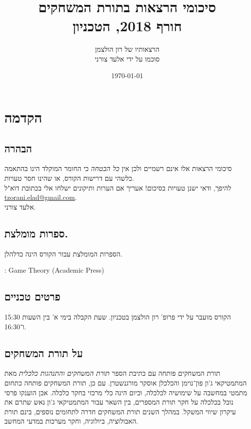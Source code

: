 \documentclass[a4paper,10pt,twoside,openany]{book}
\title{סיכומי הרצאות בתורת המשחקים \\ \large{חורף 2018, הטכניון}}
\author{הרצאותיו של רון הולצמן \\ \large סוכמו על ידי אלעד צורני}
\date{\today}
\begin{document}
\frontmatter
{}
\tableofcontents
\countlectures
\newpage

\chapter*{הקדמה}
 

\section*{הבהרה}

סיכומי הרצאות אלו אינם רשמיים ולכן אין
\emph{כל הבטחה}
כי החומר המוקלד הינו בהתאמה כלשהי עם דרישות הקורס, או שהינו חסר טעויות.
\\
להיפך, ודאי ישנן טעויות בסיכום! אעריך אם הערות ותיקונים ישלחו אלי בכתובת דוא"ל
\textenglish{\href{mailto:tzorani.elad@gmail.com}{tzorani.elad@gmail.com}}.\\
אלעד צורני.

\section*{ספרות מומלצת.}

הספרות המומלצת עבור הקורס הינה כדלהלן.

\begin{english}
\begin{description}
\item {}: Game Theory (Academic Press)
\end{description}
\end{english}

\section*{פרטים טכניים}
הקורס מועבר על ידי פרופ' רון הולצמן בטכניון.
שעת הקבלה בימי א' בין השעות 15:30 ו־16:30.

\section*{על תורת המשחקים}

תורת המשחקים פותחה עם כתיבת הספר
\emph{תורת המשחקים והתנהגות כלכלית}
מאת המתמטיקאי ג'ון פון־נוימן והכלכלן אוסקר מורגנשטרן.
עם כן, תורת המשחקים פותחה כתחום מתמטי במחשבה על שימושיה לכלכלה, וכיום הינה כלי מרכזי בחקר כלכלה.
אכן הוענקו פרסי נובל בכלכלה על חקר תורת המספרים, בין השאר עבור המתמטיקאי ג'ון נאש שתרם את עיקרון שיווי המשקל.
במהלך השנים תורת המשחקים חדרה לתחומים נוספים, בינם תורת האבולוציה, ביולוגיה, וחקר מערכות במדעי המחשב.
\end{document}
